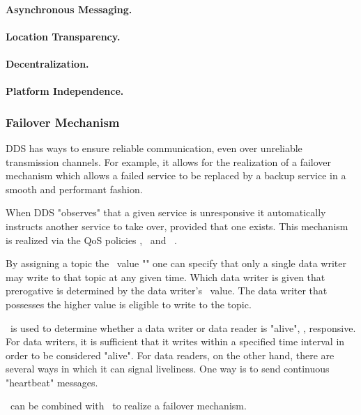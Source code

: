 \paragraph{Asynchronous Messaging.}

\paragraph{Location Transparency.}

\paragraph{Decentralization.}

\paragraph{Platform Independence.}


\subsubsection{Failover Mechanism}

DDS has ways to ensure reliable communication, even over unreliable transmission channels. For example, it allows for the realization of a failover mechanism which allows a failed service to be replaced by a backup service in a smooth and performant fashion. 

When DDS "observes" that a given service is unresponsive it automatically instructs another service to take over, provided that one exists. This mechanism is realized via the QoS policies \ownership , \ostrength\ and \liveliness\ . 

By assigning a topic the \ownership\ value "" one can specify that only a single data writer may write to that topic at any given time. Which data writer is given that prerogative is determined by the data writer's \ostrength\ value. The data writer that possesses the higher value is eligible to write to the topic.

\liveliness\ is used to determine whether a data writer or data reader is "alive", \ie , responsive. For data writers, it is sufficient that it writes within a specified time interval in order to be considered "alive". For data readers, on the other hand, there are several ways in which it can signal liveliness. One way is to send continuous "heartbeat" messages.

\ownership\ can be combined with \liveliness\ to realize a failover mechanism.



